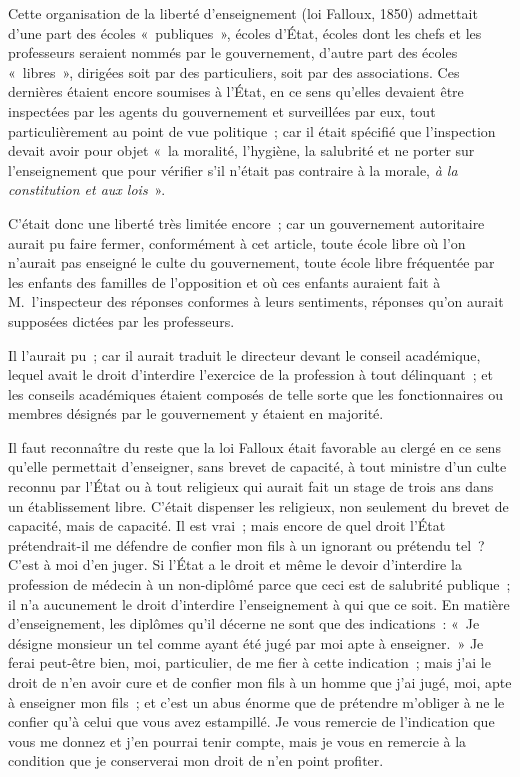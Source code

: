 \documentclass[french,twoside]{book} %
\begin{document}
Cette organisation de la liberté d’enseignement (loi Falloux, 1850) admettait d’une part des écoles « publiques », écoles d’État, écoles dont les chefs et les professeurs seraient nommés par le gouvernement, d’autre part des écoles « libres », dirigées soit par des particuliers, soit par des associations. Ces dernières étaient encore soumises à l’État, en ce sens qu’elles devaient être inspectées par les agents du gouvernement et surveillées par eux, tout particulièrement au point de vue politique ; car il était spécifié que l’inspection devait avoir pour objet « la moralité, l’hygiène, la salubrité et ne porter sur l’enseignement que pour vérifier s’il  n’était pas contraire à la morale, {\itshape à la constitution et aux lois} ».\par
C’était donc une liberté très limitée encore ; car un gouvernement autoritaire aurait pu faire fermer, conformément à cet article, toute école libre où l’on n’aurait pas enseigné le culte du gouvernement, toute école libre fréquentée par les enfants des familles de l’opposition et où ces enfants auraient fait à M. l’inspecteur des réponses conformes à leurs sentiments, réponses qu’on aurait supposées dictées par les professeurs.\par
Il l’aurait pu ; car il aurait traduit le directeur devant le conseil académique, lequel avait le droit d’interdire l’exercice de la profession à tout délinquant ; et les conseils académiques étaient composés de telle sorte que les fonctionnaires ou membres désignés par le gouvernement y étaient en majorité.\par
Il faut reconnaître du reste que la loi Falloux était favorable au clergé en ce sens qu’elle permettait d’enseigner, sans brevet de capacité, à tout ministre d’un culte reconnu par l’État ou à tout religieux qui aurait fait un stage de trois ans dans un établissement libre. C’était dispenser les religieux, non seulement du brevet de capacité, mais de capacité. Il est vrai ; mais encore de quel droit l’État prétendrait-il me défendre de confier mon  fils à un ignorant ou prétendu tel ? C’est à moi d’en juger. Si l’État a le droit et même le devoir d’interdire la profession de médecin à un non-diplômé parce que ceci est de salubrité publique ; il n’a aucunement le droit d’interdire l’enseignement à qui que ce soit. En matière d’enseignement, les diplômes qu’il décerne ne sont que des indications : « Je désigne monsieur un tel comme ayant été jugé par moi apte à enseigner. » Je ferai peut-être bien, moi, particulier, de me fier à cette indication ; mais j’ai le droit de n’en avoir cure et de confier mon fils à un homme que j’ai jugé, moi, apte à enseigner mon fils ; et c’est un abus énorme que de prétendre m’obliger à ne le confier qu’à celui que vous avez estampillé. Je vous remercie de l’indication que vous me donnez et j’en pourrai tenir compte, mais je vous en remercie à la condition que je conserverai mon droit de n’en point profiter.\par
\end{document}
